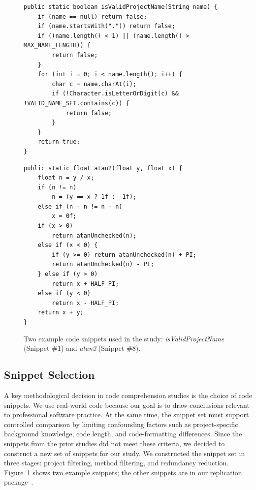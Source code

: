 \begin{figure}[t]
\centering
\small

\begin{minipage}[t]{0.48\textwidth}


\begin{lstlisting}
public static boolean isValidProjectName(String name) {
    if (name == null) return false;    
    if (name.startsWith(".")) return false;
    if ((name.length() < 1) || (name.length() > MAX_NAME_LENGTH)) {
        return false;
    }
    for (int i = 0; i < name.length(); i++) {
        char c = name.charAt(i);
        if (!Character.isLetterOrDigit(c) && !VALID_NAME_SET.contains(c)) {
            return false;
        }
    }
    return true;
}
\end{lstlisting}
\end{minipage}
\hfill
\begin{minipage}[t]{0.48\textwidth}


\begin{lstlisting}
public static float atan2(float y, float x) {
    float n = y / x;
    if (n != n)
        n = (y == x ? 1f : -1f);
    else if (n - n != n - n)
        x = 0f;
    if (x > 0)
        return atanUnchecked(n);
    else if (x < 0) {
        if (y >= 0) return atanUnchecked(n) + PI;
        return atanUnchecked(n) - PI;
    } else if (y > 0)
        return x + HALF_PI;
    else if (y < 0)
        return x - HALF_PI;
    return x + y;
}
\end{lstlisting}
\end{minipage}

\caption{Two example code snippets used in the study: \emph{isValidProjectName} (Snippet \#1) and \emph{atan2} (Snippet \#8).}
\label{fig:example_snippets}
\end{figure}

\subsection{Snippet Selection}
\label{sec:snippets}
A key methodological decision in code comprehension studies is the
choice of code snippets. We use real-world code because our goal is to
draw conclusions relevant to professional software practice. At the
same time, the snippet set must support controlled comparison by
limiting confounding factors such as project-specific background
knowledge, code length, and code-formatting differences. Since the snippets from the prior studies did not meet these criteria, we decided to construct a new set of snippets for our study.  
We constructed the snippet set in three stages: project filtering,
method filtering, and redundancy reduction.
Figure~\ref{fig:example_snippets} shows two example
snippets; the other snippets are in our replication
package~\cite{replication-package}.

